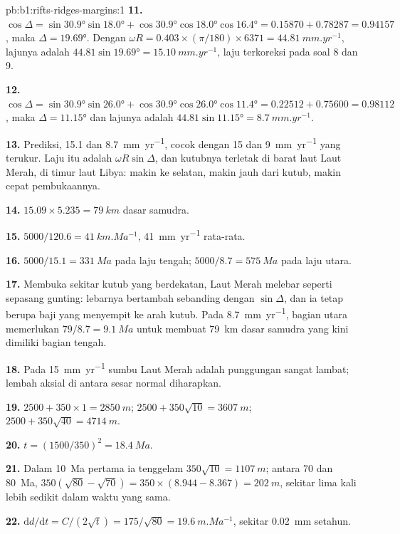 \begin{solution}{pb:b1:rifts-ridges-margins:1}
\textbf{11.} $\cos\Delta = \sin\ang{30.9}\sin\ang{18.0} +
\cos\ang{30.9}\cos\ang{18.0}\cos\ang{16.4} = 0.15870 + 0.78287 = 0.94157$, maka
$\Delta = \ang{19.69}$. Dengan $\omega R = 0.403\times(\pi/180)\times6371 =
\qty{44.81}{mm.yr^{-1}}$, lajunya adalah $44.81\sin\ang{19.69} =
\qty{15.10}{mm.yr^{-1}}$, laju terkoreksi pada soal 8 dan 9.

\textbf{12.} $\cos\Delta = \sin\ang{30.9}\sin\ang{26.0} +
\cos\ang{30.9}\cos\ang{26.0}\cos\ang{11.4} = 0.22512 + 0.75600 = 0.98112$, maka
$\Delta = \ang{11.15}$ dan lajunya adalah $44.81\sin\ang{11.15} =
\qty{8.7}{mm.yr^{-1}}$.

\textbf{13.} Prediksi, 15.1 dan \qty{8.7}{mm.yr^{-1}}, cocok dengan 15 dan
\qty{9}{mm.yr^{-1}} yang terukur. Laju itu adalah $\omega R\sin\Delta$, dan kutubnya
terletak di barat laut Laut Merah, di timur laut Libya: makin ke selatan, makin jauh dari
kutub, makin cepat pembukaannya.

\textbf{14.} $15.09\times5.235 = \qty{79}{km}$ dasar samudra.

\textbf{15.} $5000/120.6 = \qty{41}{km.Ma^{-1}}$, \qty{41}{mm.yr^{-1}} rata-rata.

\textbf{16.} $5000/15.1 = \qty{331}{Ma}$ pada laju tengah;
$5000/8.7 = \qty{575}{Ma}$ pada laju utara.

\textbf{17.} Membuka sekitar kutub yang berdekatan, Laut Merah melebar seperti sepasang
gunting: lebarnya bertambah sebanding dengan $\sin\Delta$, dan ia tetap berupa baji yang
menyempit ke arah kutub. Pada \qty{8.7}{mm.yr^{-1}}, bagian utara memerlukan
$79/8.7 = \qty{9.1}{Ma}$ untuk membuat \qty{79}{km} dasar samudra yang kini dimiliki
bagian tengah.

\textbf{18.} Pada \qty{15}{mm.yr^{-1}} sumbu Laut Merah adalah punggungan sangat lambat;
lembah aksial di antara sesar normal diharapkan.

\textbf{19.} $2500 + 350\times1 = \qty{2850}{m}$;
$2500 + 350\sqrt{10} = \qty{3607}{m}$; $2500 + 350\sqrt{40} = \qty{4714}{m}$.

\textbf{20.} $t = (1500/350)^2 = \qty{18.4}{Ma}$.

\textbf{21.} Dalam \qty{10}{Ma} pertama ia tenggelam $350\sqrt{10} = \qty{1107}{m}$;
antara 70 dan \qty{80}{Ma}, $350(\sqrt{80} - \sqrt{70}) = 350\times(8.944 -
8.367) = \qty{202}{m}$, sekitar lima kali lebih sedikit dalam waktu yang sama.

\textbf{22.} $\mathrm dd/\mathrm dt = C/(2\sqrt t) = 175/\sqrt{80} =
\qty{19.6}{m.Ma^{-1}}$, sekitar \qty{0.02}{mm} setahun.


\end{solution}
